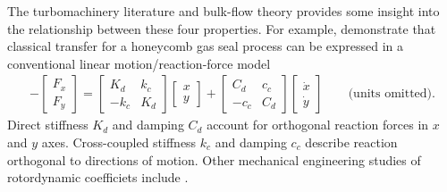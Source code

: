 \documentclass[12pt]{article}
\begin{document}
The turbomachinery literature and bulk-flow theory \citep{Hirs:1973} provides
some insight into the relationship between these four properties. For example,
\cite{D'Souza:Childs:2002} demonstrate that classical transfer for a honeycomb
gas seal process can be expressed in a conventional linear
motion/reaction-force model
\begin{align}
- \begin{bmatrix} 
F_x  \\ 
F_y  
\end{bmatrix} = \begin{bmatrix} 
K_d & k_c \\ 
-k_c & K_d 
\end{bmatrix} \begin{bmatrix} 
x  \\ 
y 
\end{bmatrix} +
\begin{bmatrix} 
C_d & c_c  \\ 
-c_c & C_d 
\end{bmatrix} \begin{bmatrix} 
\dot x  \\ 
\dot y 
\end{bmatrix}
\label{eq:trans}
\quad \quad \mbox{(units omitted).}
\end{align}
Direct stiffness $K_d$ and damping $C_d$ account for orthogonal reaction
forces in $x$ and $y$ axes. Cross-coupled stiffness $k_c$ and damping $c_c$
describe reaction orthogonal to directions of motion. Other mechanical
engineering studies of rotordynamic coefficiets include
\citet{childs,isotseal,delgado2012}.
\end{document}
